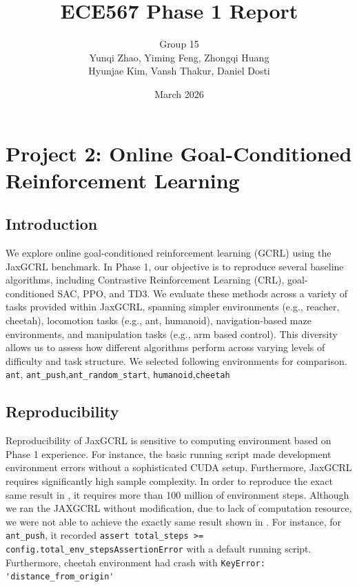 \documentclass[11pt]{article}
\title{ECE567 Phase 1 Report}
\author{
Group 15 \\
Yunqi Zhao, Yiming Feng, Zhongqi Huang \\
Hyunjae Kim, Vansh Thakur, Daniel Dosti
}
\date{March 2026}
\begin{document}
\maketitle


\section*{Project 2: Online Goal-Conditioned Reinforcement Learning}
\subsection*{Introduction}

We explore online goal-conditioned reinforcement learning (GCRL) using the JaxGCRL benchmark. In Phase 1, our objective is to reproduce several baseline algorithms, including Contrastive Reinforcement Learning (CRL), goal-conditioned SAC, PPO, and TD3.
\newline
\noindent
We evaluate these methods across a variety of tasks provided within JaxGCRL, spanning simpler environments (e.g., reacher, cheetah), locomotion tasks (e.g., ant, humanoid), navigation-based maze environments, and manipulation tasks (e.g., arm based control). This diversity allows us to assess how different algorithms perform across varying levels of difficulty and task structure.
\newline
\noindent
We selected following environments for comparison.
\newline
\noindent
\texttt{ant}, \texttt{ant\_push},\texttt{ant\_random\_start}, \texttt{humanoid},\texttt{cheetah}
\subsection*{Reproducibility}
Reproducibility of JaxGCRL is sensitive to computing environment based on Phase 1 experience. For instance, the basic running script made development environment errors without a sophisticated CUDA setup. Furthermore, JaxGCRL requires significantly high sample complexity. In order to reproduce the exact same result in \cite{bortkiewicz2025acceleratinggoalconditionedrlalgorithms}, it requires more than 100 million of environment steps. Although we ran the JAXGCRL without modification, due to lack of computation resource, we were not able to achieve the exactly same result shown in \cite{bortkiewicz2025acceleratinggoalconditionedrlalgorithms}. For instance, for \texttt{ant\_push}, it recorded \verb|assert total_steps >= config.total_env_steps|\verb|AssertionError| with a default running script. Furthermore, cheetah environment had crash with \verb|KeyError: 'distance_from_origin'|
\end{document}
